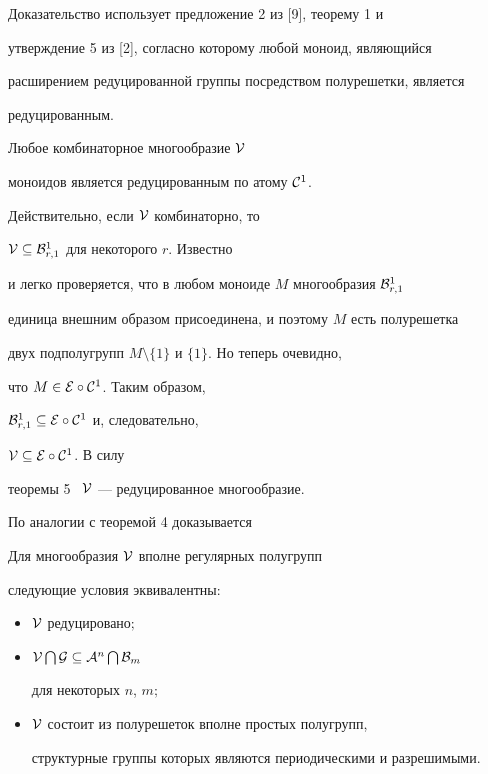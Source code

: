 Доказательство использует предложение 2 из [9], теорему 1 и


утверждение 5 из [2], согласно которому любой моноид, являющийся


расширением редуцированной группы посредством полурешетки, является


редуцированным. 





\begin{cor}


Любое комбинаторное многообразие ${\cal V}$


моноидов является редуцированным по атому ${\cal C}^1$.


\end{cor}





Действительно, если ${\cal V}$ комбинаторно, то


${\cal V}\subseteq {\cal B}_{r,1}^1$ для некоторого $r$. Известно


и легко проверяется, что в любом моноиде $M$ многообразия ${\cal B}_{r,1}^1$


единица внешним образом присоединена, и поэтому $M$ есть полурешетка


двух подполугрупп $M\setminus \{1\}$ и $\{1\}$. Но теперь очевидно,


что $M\in {\cal E} \circ {\cal C}^1$. Таким образом,


${\cal B}_{r,1}^1 \subseteq {\cal E} \circ {\cal C}^1$ и, следовательно,


${\cal V}\subseteq {\cal E} \circ {\cal C}^1$. В силу


теоремы 5 \ ${\cal V}$ --- редуцированное многообразие. 





По аналогии с теоремой 4 доказывается 





\begin{thm}


Для многообразия ${\cal V}$ вполне регулярных полугрупп


следующие условия эквивалентны\/${:}$ 


\begin{itemize}


\item[(i)] ${\cal V}$ редуцировано$;$


\item[(ii)] ${\cal V}\bigcap {\cal G} \subseteq {\cal A}^n\bigcap {\cal B}_m$


для некоторых $n$, $m;$


\item[(iii)] ${\cal V}$ состоит из полурешеток вполне простых полугрупп,


структурные группы которых являются периодическими и разрешимыми.


\end{itemize}


\end{thm}








